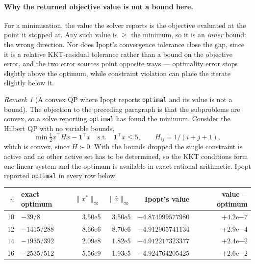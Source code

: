 \documentclass[11pt]{article}
\theoremstyle{plain}
\theoremstyle{remark}
\newtheorem{remark}[lemma]{Remark}
\newcommand{\vhat}{\hat{v}}
\begin{document}
\paragraph{Why the returned objective value is not a bound here.}
For a minimisation, the value the solver reports is the objective evaluated at
the point it stopped at.  Any such value is $\ge$ the minimum, so it is an
\emph{inner} bound: the wrong direction.  Nor does Ipopt's convergence tolerance
close the gap, since it is a relative KKT-residual tolerance rather than a bound
on the objective error, and the two error sources point opposite ways ---
optimality error stops slightly above the optimum, while constraint violation
can place the iterate slightly below it.

\begin{remark}[A convex QP where Ipopt reports \texttt{optimal} and its value is
not a bound]\label{rem:measured}
The objection to the preceding paragraph is that the subproblems are convex, so
a solve reporting \texttt{optimal} has found the minimum.  Consider the Hilbert
QP with no variable bounds,
\[
  \min \tfrac12 x^{\top} H x - \mathbf{1}^{\top} x
  \quad \text{s.t.} \quad \mathbf{1}^{\top} x \le 5,
  \qquad H_{ij} = 1/(i+j+1),
\]
which is convex, since $H \succ 0$.  With the bounds dropped the single
constraint is active and no other active set has to be determined, so the KKT
conditions form one linear system and the optimum is available in exact rational
arithmetic.  Ipopt reported \texttt{optimal} in every row below.

\begin{center}
\begin{tabular}{rlrrrr}
\toprule
$n$ & exact optimum & $\|x^{*}\|_{\infty}$ & $\|\vhat\|_{\infty}$
    & Ipopt's value & value $-$ optimum \\
\midrule
10 & $-39/8$      & 3.50e5 & 3.50e5 & $-4.874999577980$ & $+4.2\mathrm{e}{-7}$ \\
12 & $-1415/288$  & 8.66e6 & 8.70e6 & $-4.912905741134$ & $+2.9\mathrm{e}{-4}$ \\
14 & $-1935/392$  & 2.09e8 & 1.82e5 & $-4.912217323377$ & $+2.4\mathrm{e}{-2}$ \\
16 & $-2535/512$  & 5.56e9 & 1.93e5 & $-4.924764205425$ & $+2.6\mathrm{e}{-2}$ \\
\bottomrule
\end{tabular}
\end{center}


\end{remark}
\end{document}
